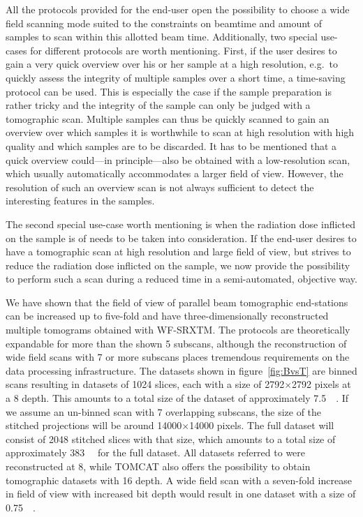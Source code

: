 All the protocols provided for the end-user open the possibility to choose a wide field scanning mode suited to the constraints on beamtime and amount of samples to scan within this allotted beam time. Additionally, two special use-cases for different protocols are worth mentioning. First, if the user desires to gain a very quick overview over his or her sample at a high resolution, e.g.\ to quickly assess the integrity of multiple samples over a short time, a time-saving protocol can be used. This is especially the case if the sample preparation is rather tricky and the integrity of the sample can only be judged with a tomographic scan. Multiple samples can thus be quickly scanned to gain an overview over which samples it is worthwhile to scan at high resolution with high quality and which samples are to be discarded. It has to be mentioned that a quick overview could---in principle---also be obtained with a low-resolution scan, which usually automatically accommodates a larger field of view. However, the resolution of such an overview scan is not always sufficient to detect the interesting features in the samples.

The second special use-case worth mentioning is when the radiation dose inflicted on the sample is of needs to be taken into consideration. If the end-user desires to have a tomographic scan at high resolution and large field of view, but strives to reduce the radiation dose inflicted on the sample, we now provide the possibility to perform such a scan during a reduced time in a semi-automated, objective way.

We have shown that the field of view of parallel beam tomographic end-stations can be increased up to five-fold and have three-dimensionally reconstructed multiple tomograms obtained with WF-SRXTM. The protocols are theoretically expandable for more than the shown 5 subscans, although the reconstruction of wide field scans with 7 or more subscans places tremendous requirements on the data processing infrastructure. The datasets shown in figure~\ref{fig:BvsT} are binned scans resulting in datasets of 1024 slices, each with a size of 2792$\times$2792 pixels at a \SI{8}{\bit} depth. This amounts to a total size of the dataset of approximately \SI{7.5}{\giga\byte}. If we assume an un-binned scan with 7 overlapping subscans, the size of the stitched projections will be around 14000$\times$14000 pixels. The full dataset will consist of 2048 stitched slices with that size, which amounts to a total size of approximately \SI{383}{\giga\byte} for the full dataset. All datasets referred to were reconstructed at \SI{8}{\bit}, while TOMCAT also offers the possibility to obtain tomographic datasets with \SI{16}{\bit} depth. A wide field scan with a seven-fold increase in field of view with increased bit depth would result in one dataset with a size of \SI{0.75}{\tera\byte}.

